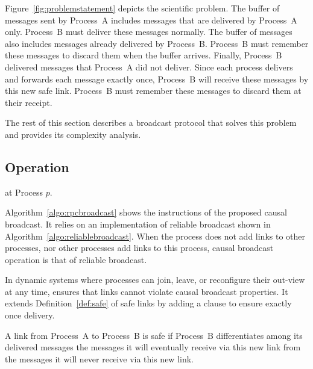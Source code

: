 Figure~\ref{fig:problemstatement} depicts the scientific problem. The buffer of
messages sent by Process~A includes messages that are delivered by Process~A
only. Process~B must deliver these messages normally. The buffer of messages
also includes messages already delivered by Process~B. Process~B must remember
these messages to discard them when the buffer arrives. Finally, Process~B
delivered messages that Process~A did not deliver. Since each process delivers
and forwards each message exactly once, Process~B will receive these messages by
this new safe link. Process~B must remember these messages to discard them at
their receipt.

The rest of this section describes a broadcast protocol that solves this problem
and provides its complexity analysis.


\subsection{Operation}

\begin{algorithm}[h]
  
  \caption{\label{algo:rpcbroadcast}\RPCBROADCAST at Process $p$.}
\end{algorithm}


Algorithm~\ref{algo:rpcbroadcast} shows the instructions of the proposed causal
broadcast. It relies on an implementation of reliable broadcast shown in
Algorithm~\ref{algo:reliablebroadcast}. When the process does not add links to
other processes, nor other processes add links to this process, causal broadcast
operation is that of reliable broadcast. 

In dynamic systems where processes can join, leave, or reconfigure their
out-view at any time, \RPCBROADCAST ensures that links cannot violate causal
broadcast properties. It extends Definition~\ref{def:safe} of safe links by
adding a clause to ensure exactly once delivery.


\begin{definition}[\label{def:extension}Safe link extension]
  A link from Process~A to Process~B is safe if Process~B differentiates among
  its delivered messages the messages it will eventually receive via this new
  link from the messages it will never receive via this new link.
\end{definition}

